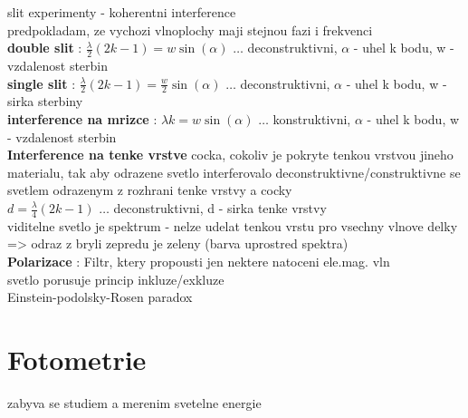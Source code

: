 \documentclass{report}
\begin{document}
slit experimenty - koherentni interference \\
predpokladam, ze vychozi vlnoplochy maji stejnou fazi i frekvenci \\

\textbf{double slit} : $\frac{\lambda}{2}(2k-1)=w\sin(\alpha)$ $\ldots$ deconstruktivni, $\alpha$ - uhel k bodu, w - vzdalenost sterbin\\
\textbf{single slit} : $\frac{\lambda}{2}(2k-1)=\frac{w}{2}\sin(\alpha)$ $\ldots$ deconstruktivni, $\alpha$ - uhel k bodu, w - sirka sterbiny\\
\textbf{interference na mrizce} : $\lambda k=w\sin(\alpha)$ $\ldots$ konstruktivni, $\alpha$ - uhel k bodu, w - vzdalenost sterbin\\

\textbf{Interference na tenke vrstve}
cocka, cokoliv je pokryte tenkou vrstvou jineho materialu, tak aby odrazene svetlo interferovalo deconstruktivne/construktivne se svetlem odrazenym z rozhrani tenke vrstvy a cocky \\

$d=\frac{\lambda}{4}(2k-1)$ $\ldots$ deconstruktivni, d - sirka tenke vrstvy \\
viditelne svetlo je spektrum - nelze udelat tenkou vrstu pro vsechny vlnove delky => odraz z bryli zepredu je zeleny (barva uprostred spektra) \\


\textbf{Polarizace} : Filtr, ktery propousti jen nektere natoceni ele.mag. vln \\
svetlo porusuje princip inkluze/exkluze \\
Einstein-podolsky-Rosen paradox \\

\newpage


\section{Fotometrie}

\vspace{0.5cm}
zabyva se studiem a merenim svetelne energie \\
\end{document}
